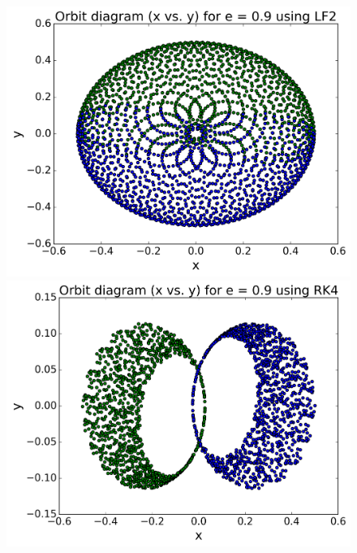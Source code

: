 \begin{figure}[H]
	\centering
	\begin{minipage}[b]{0.48\linewidth}
		\includegraphics[width=\linewidth]{plots_p1/LF2_e09_xy.png}
	\end{minipage}
	\begin{minipage}[b]{0.48\linewidth}
		\includegraphics[width=\linewidth]{plots_p1/RK4_e09_xy.png}
	\end{minipage}
\end{figure}

